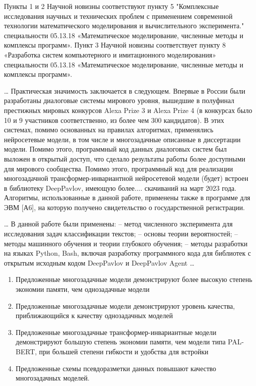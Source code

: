 Пункты 1 и 2 Научной новизны соответствуют пункту 5 "Комплексные исследования научных и технических проблем с применением современной технологии математического моделирования и
вычислительного эксперимента." специальности 05.13.18 «Математическое моделирование, численные методы и комплексы программ». Пункт 3  Научной новизны соответствует пункту 8 «Разработка систем компьютерного и имитаци­онного моделирования» специальности 05.13.18 «Математическое моделирование,
численные методы и комплексы программ».


{\influence} \ldots
Практическая значимость заключается в следующем. Впервые в России были разработаны диалоговые системы мирового уровня, вышедшие в полуфинал престижных мировых конкурсов Alexa Prize 3 и Alexa Prize 4 (в конкурсах было 10 и 9 участников соответственно, из более чем 300 кандидатов). В этих системах, помимо основанных на правилах алгоритмах, применялись нейросетевые модели, в том числе и многозадачные описанные в диссертации модели. Помимо этого, программный код данных диалоговых систем был выложен в открытый доступ, что сделало результаты работы более доступными для мирового сообщества.
Помимо этого, программный код для реализации многозадачной трансформер-инвариантной нейросетевой модели (будет) встроен в библиотеку DeepPavlov, имеющую более.... скачиваний на март 2023 года.
Алгоритмы, использованные в данной работе, применены также в программе для ЭВМ [А6], на которую получено свидетельство о государственной регистрации.


{\methods} \ldots
В данной работе были
применены:
– метод численного эксперимента для исследования задач классифи­кации текстов;
– основы теории вероятностей;
– методы машинного обучения и теории глубокого обучения;
– методы разработки на языках Python, Bash, включая разработку программного кода для библиотек с открытым исходным кодом
DeepPavlov и DeepPavlov Agent
\ldots

{}
\begin{enumerate}
\item Предложенные многозадачные модели демонстрируют более высокую степень экономии памяти, чем однозадачные модели
\item Предложенные многозадачные модели демонстрируют уровень качества, приближающийся к качеству однозадачных моделей
\item Предложенные многозадачные трансформер-инвариантные модели демонстрируют большую степень экономии памяти, чем модели типа PAL-BERT, при большей степени гибкости и удобства для встройки
\item Предложенные схемы псевдоразметки данных повышают качество многозадачных моделей.
\end{enumerate}


